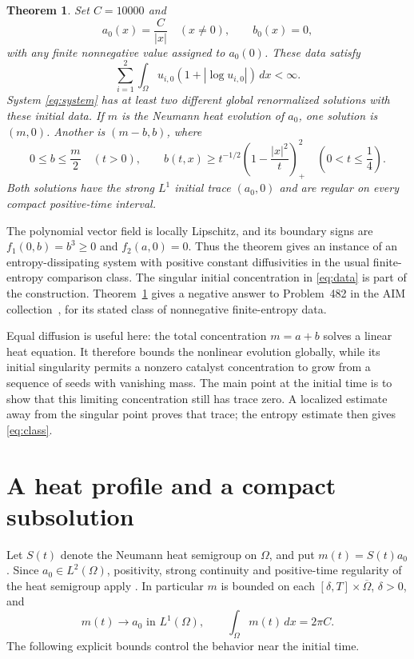 \documentclass[11pt]{article}
\newtheorem{theorem}{Theorem}[section]
\theoremstyle{definition}
\newcommand{\Om}{\Omega}
\newcommand{\dd}{\,dx}
\begin{document}
\begin{theorem}\label{thm:main}
Set $C=10000$ and
\begin{equation}\label{eq:data}
 a_0(x)=\frac C{|x|}\quad(x\ne0),\qquad b_0(x)=0,
\end{equation}
with any finite nonnegative value assigned to $a_0(0)$. These data satisfy
\[
 \sum_{i=1}^2\int_\Om u_{i,0}(1+|\log u_{i,0}|)\dd<\infty.
\]
System \eqref{eq:system} has at least two different global renormalized
solutions with these initial data. If $m$ is the Neumann heat evolution of
$a_0$, one solution is $(m,0)$. Another is $(m-b,b)$, where
\begin{equation}\label{eq:nonzero-bound}
 0\le b\le\frac m2\quad(t>0),\qquad
 b(t,x)\ge t^{-1/2}\left(1-\frac{|x|^2}{t}\right)_+^2
       \quad\left(0<t\le\frac14\right).
\end{equation}
Both solutions have the strong $L^1$ initial trace $(a_0,0)$ and are regular
on every compact positive-time interval.
\end{theorem}

The polynomial vector field is locally Lipschitz, and its boundary signs
are $f_1(0,b)=b^3\ge0$ and $f_2(a,0)=0$. Thus the theorem gives an instance
of an entropy-dissipating system with positive constant diffusivities in
the usual finite-entropy comparison class. The singular initial
concentration in \eqref{eq:data} is part of the construction.
Theorem~\ref{thm:main} gives a negative answer to Problem~482 in the AIM
collection~\cite{AIM2026}, for its stated class of nonnegative finite-entropy
data.

Equal diffusion is useful here: the total concentration $m=a+b$ solves a
linear heat equation. It therefore bounds the nonlinear evolution globally,
while its initial singularity permits a nonzero catalyst concentration to
grow from a sequence of seeds with vanishing mass. The main point at the
initial time is to show that this limiting concentration still has trace
zero. A localized estimate away from the singular point proves that trace;
the entropy estimate then gives \eqref{eq:class}.

\section{A heat profile and a compact subsolution}

Let $S(t)$ denote the Neumann heat semigroup on $\Om$, and put
$m(t)=S(t)a_0$. Since $a_0\in L^2(\Om)$, positivity, strong continuity and
positive-time regularity of the heat semigroup apply
\cite[Example~5.2]{SchnaubeltLinear}. In particular $m$ is bounded on each
$[\delta,T]\times\overline\Om$, $\delta>0$, and
\begin{equation}\label{eq:heat-trace}
 m(t)\longrightarrow a_0\text{ in }L^1(\Om),\qquad
 \int_\Om m(t)\dd=2\pi C.
\end{equation}
The following explicit bounds control the behavior near the initial time.
\end{document}
